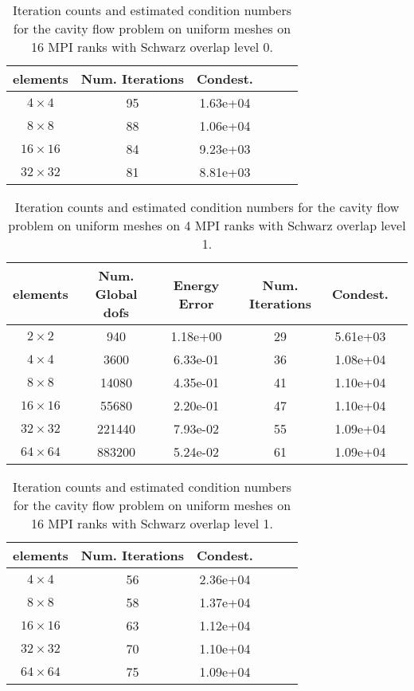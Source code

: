 \documentclass[11pt]{amsart}
\begin{document}
\begin{table}
\begin{tabular}{ c  c  c  c  c  c }
elements	&Num. Iterations	&Condest.\\
\hline
$4 \times 4$	&95	&1.63e+04\\
$8 \times 8$	&88	&1.06e+04\\
$16 \times 16$	&84	&9.23e+03\\
$32 \times 32$	&81	&8.81e+03\\
\end{tabular}
\caption{Iteration counts and estimated condition numbers for the cavity flow problem on uniform meshes on 16 MPI ranks with Schwarz overlap level 0.}
\label{table:stokesConditioningStudyUniformMesh16Ranks}
\end{table}

\begin{table}
\begin{tabular}{ c  c  c  c  c  c }
elements	& Num. Global dofs	&Energy Error	&Num. Iterations	&Condest.		\\
\hline
$2 \times 2$	&940		&1.18e+00	&29	&5.61e+03\\
$4 \times 4$	&3600		&6.33e-01		&36	&1.08e+04\\
$8 \times 8$	&14080		&4.35e-01		&41	&1.10e+04\\
$16 \times 16$	&55680		&2.20e-01		&47	&1.10e+04\\
$32 \times 32$	&221440		&7.93e-02		&55	&1.09e+04\\
$64 \times 64$	&883200		&5.24e-02		&61	&1.09e+04\\
\end{tabular}
\caption{Iteration counts and estimated condition numbers for the cavity flow problem on uniform meshes on 4 MPI ranks with Schwarz overlap level 1.}
\label{table:stokesConditioningStudyUniformMesh4RanksOverlap1}
\end{table}

\begin{table}
\begin{tabular}{ c  c  c  c  c  c }
elements	&Num. Iterations	&Condest.\\
\hline
$4 \times 4$	&56	&2.36e+04\\
$8 \times 8$	&58	&1.37e+04\\
$16 \times 16$	&63	&1.12e+04\\
$32 \times 32$	&70	&1.10e+04\\
$64 \times 64$	&75	&1.09e+04\\
\end{tabular}
\caption{Iteration counts and estimated condition numbers for the cavity flow problem on uniform meshes on 16 MPI ranks with Schwarz overlap level 1.}
\label{table:stokesConditioningStudyUniformMesh16RanksOverlap1}
\end{table}
\end{document}
